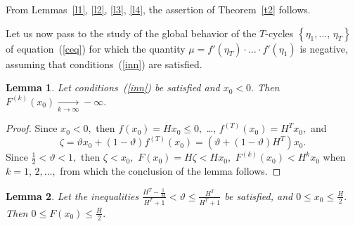 \documentclass[12pt,a4paper]{amsart}
\newtheorem{lemma}{Lemma}
\begin{document}
From Lemmas~\ref{l1}, \ref{l2}, \ref{l3}, \ref{l4}, the assertion of Theorem~\ref{t2} follows.

Let us now pass to the study of the global behavior of the $T$-cycles $\left\{\eta_1,\ldots,\,\eta_T\right\}$ of equation~(\ref{ceq}) 
for which the quantity $\mu = f'(\eta_T)\cdot\ldots\cdot f'(\eta_1)$ is negative, assuming that conditions~(\ref{inn}) are satisfied.

\begin{lemma}\label{l5}
Let conditions~(\ref{inn}) be satisfied and $x_0<0.$ Then $F^{(k)}(x_0)\xrightarrow[k\rightarrow\infty]{}-\infty.$  
\end{lemma}

\begin{proof}
Since $x_0<0,$ then $f(x_0)=Hx_0\leq 0,$ \ldots, $f^{(T)}(x_0)=H^T x_0,$ and 
$$
\zeta=\vartheta x_0 + (1-\vartheta)f^{(T)}(x_0)=\left(\vartheta + (1 - \vartheta) H^T \right)x_0.
$$
Since $\frac12<\vartheta<1,$ then $\zeta<x_0,$ $F(x_0)=H\zeta<H x_0,$ $F^{(k)}(x_0)<H^k x_0$ when $k=1,\,2,\ldots,$ 
from which the conclusion of the lemma follows.
\end{proof}

\begin{lemma}\label{l6}
Let the inequalities $\frac{H^T-\frac{1}{H}}{H^T+1}<\vartheta \leq \frac{H^T}{H^T+1}$ be satisfied, and $0\leq x_0 \leq \frac{H}{2}.$ 
Then $0\leq F(x_0)\leq \frac{H}{2}.$  
\end{lemma}
\end{document}
